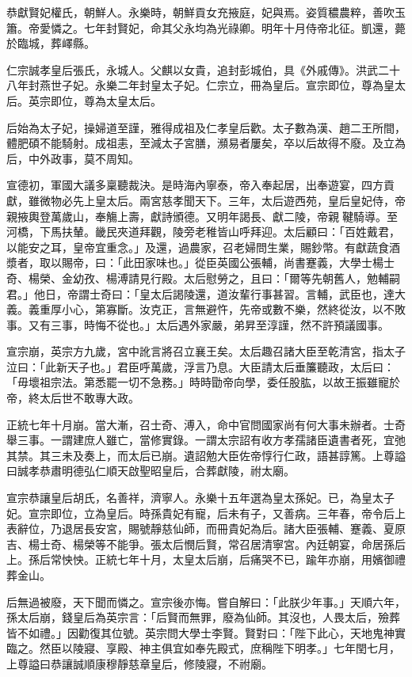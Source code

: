 恭獻賢妃權氏，朝鮮人。永樂時，朝鮮貢女充掖庭，妃與焉。姿質穠農粹，善吹玉簫。帝愛憐之。七年封賢妃，命其父永均為光祿卿。明年十月侍帝北征。凱還，薨於臨城，葬嶧縣。

仁宗誠孝皇后張氏，永城人。父麒以女貴，追封彭城伯，具《外戚傳》。洪武二十八年封燕世子妃。永樂二年封皇太子妃。仁宗立，冊為皇后。宣宗即位，尊為皇太后。英宗即位，尊為太皇太后。

后始為太子妃，操婦道至謹，雅得成祖及仁孝皇后歡。太子數為漢、趙二王所間，體肥碩不能騎射。成祖恚，至減太子宮膳，瀕易者屢矣，卒以后故得不廢。及立為后，中外政事，莫不周知。

宣德初，軍國大議多稟聽裁決。是時海內寧泰，帝入奉起居，出奉遊宴，四方貢獻，雖微物必先上皇太后。兩宮慈孝聞天下。三年，太后遊西苑，皇后皇妃侍，帝親掖輿登萬歲山，奉觴上壽，獻詩頒德。又明年謁長、獻二陵，帝親鞬騎導。至河橋，下馬扶輦。畿民夾道拜觀，陵旁老稚皆山呼拜迎。太后顧曰：「百姓戴君，以能安之耳，皇帝宜重念。」及還，過農家，召老婦問生業，賜鈔幣。有獻蔬食酒漿者，取以賜帝，曰：「此田家味也。」從臣英國公張輔，尚書蹇義，大學士楊士奇、楊榮、金幼孜、楊溥請見行殿。太后慰勞之，且曰：「爾等先朝舊人，勉輔嗣君。」他日，帝謂士奇曰：「皇太后謁陵還，道汝輩行事甚習。言輔，武臣也，達大義。義重厚小心，第寡斷。汝克正，言無避忤，先帝或數不樂，然終從汝，以不敗事。又有三事，時悔不從也。」太后遇外家嚴，弟昇至淳謹，然不許預議國事。

宣宗崩，英宗方九歲，宮中訛言將召立襄王矣。太后趣召諸大臣至乾清宮，指太子泣曰：「此新天子也。」君臣呼萬歲，浮言乃息。大臣請太后垂簾聽政，太后曰：「毋壞祖宗法。第悉罷一切不急務。」時時勖帝向學，委任股肱，以故王振雖寵於帝，終太后世不敢專大政。

正統七年十月崩。當大漸，召士奇、溥入，命中官問國家尚有何大事未辦者。士奇舉三事。一謂建庶人雖亡，當修實錄。一謂太宗詔有收方孝孺諸臣遺書者死，宜弛其禁。其三未及奏上，而太后已崩。遺詔勉大臣佐帝惇行仁政，語甚諄篤。上尊謚曰誠孝恭肅明德弘仁順天啟聖昭皇后，合葬獻陵，祔太廟。

宣宗恭讓皇后胡氏，名善祥，濟寧人。永樂十五年選為皇太孫妃。已，為皇太子妃。宣宗即位，立為皇后。時孫貴妃有寵，后未有子，又善病。三年春，帝令后上表辭位，乃退居長安宮，賜號靜慈仙師，而冊貴妃為后。諸大臣張輔、蹇義、夏原吉、楊士奇、楊榮等不能爭。張太后憫后賢，常召居清寧宮。內廷朝宴，命居孫后上。孫后常怏怏。正統七年十月，太皇太后崩，后痛哭不已，踰年亦崩，用嬪御禮葬金山。

后無過被廢，天下聞而憐之。宣宗後亦悔。嘗自解曰：「此朕少年事。」天順六年，孫太后崩，錢皇后為英宗言：「后賢而無罪，廢為仙師。其沒也，人畏太后，殮葬皆不如禮。」因勸復其位號。英宗問大學士李賢。賢對曰：「陛下此心，天地鬼神實臨之。然臣以陵寢、享殿、神主俱宜如奉先殿式，庶稱陛下明孝。」七年閏七月，上尊謚曰恭讓誠順康穆靜慈章皇后，修陵寢，不祔廟。

